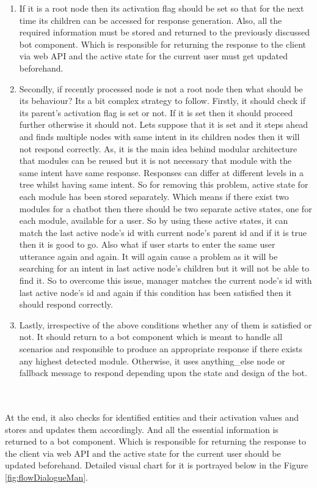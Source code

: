\begin{enumerate}
    \item If it is a root node then its activation flag should be set so that for the next time its children can be accessed for response generation. Also, all the required information must be stored and returned to the previously discussed bot component. Which is responsible for returning the response to the client via web API and the active state for the current user must get updated beforehand. 
    \item Secondly, if recently processed node is not a root node then what should be its behaviour? Its a bit complex strategy to follow. Firstly, it should check if its parent's activation flag is set or not. If it is set then it should proceed further otherwise it should not. Lets suppose that it is set and it steps ahead and finds multiple nodes with same intent in its children nodes then it will not respond correctly. As, it is the main idea behind modular architecture that modules can be reused but it is not necessary that module with the same intent have same response. Responses can differ at different levels in a tree whilst having same intent. So for removing this problem, active state for each module has been stored separately. Which means if there exist two modules for a chatbot then there should be two separate active states, one for each module, available for a user. So by using these active states, it can match the last active node's id with current node's parent id and if it is true then it is good to go. Also what if user starts to enter the same user utterance again and again. It will again cause a problem as it will be searching for an intent in last active node's children but it will not be able to find it. So to overcome this issue, manager matches the current node's id with last active node's id and again if this condition has been satisfied then it should respond correctly. 
    \item Lastly, irrespective of the above conditions whether any of them is satisfied or not. It should return to a bot component which is meant to handle all scenarios and responsible to produce an appropriate response if there exists any highest detected module. Otherwise, it uses anything\_else node or fallback message to respond depending upon the state and design of the bot.
\end{enumerate} 
\\~\\
At the end, it also checks for identified entities and their activation values and stores and updates them accordingly. And all the essential information is returned to a bot component. Which is responsible for returning the response to the client via web API and the active state for the current user should be updated beforehand. Detailed visual chart for it is portrayed below in the Figure \ref{fig:flowDialogueMan}.

